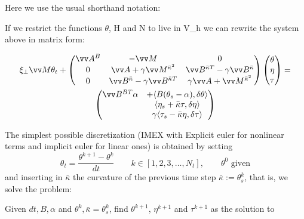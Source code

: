 Here we use the usual shorthand notation:


If we restrict the functions $\theta$, H and N to live in V_h we can rewrite the system above in matrix form:


\begin{multline}
\label{eq:4}
\xi_\perp\vv M \theta_t + 
\begin{pmatrix}
\vv A^B &  -\vv M & 0 \\
0 & 
 \vv A
+ \gamma \vv M^{\bar \kappa^2} &
 \vv B^{\bar\kappa T}
- \gamma\vv B^{\bar\kappa} \\
0 & 
 \vv B^{\bar\kappa}
- \gamma\vv B^{\bar\kappa T} 
&
%
%
\gamma \vv A
+ \vv M^{\bar \kappa^2}
\end{pmatrix}
%
\begin{pmatrix}
\theta\phantom{\big|\!\!}\\
\eta\phantom{\big|\!\!} \\
\tau\phantom{\big|\!\!}
\end{pmatrix}
=\\
\begin{pmatrix}
\vv B^{BT}\alpha & +\langle B(\theta_s-\alpha), \delta \theta\rangle\\
& \langle \eta_s+\bar\kappa\tau,\delta\eta\rangle
\\
&\gamma\langle\tau_{s}-\bar \kappa\eta, \delta\tau\rangle 
\end{pmatrix}
\end{multline}

The simplest possible discretization (IMEX with Explicit euler for
nonlinear terms and implicit euler for linear ones) is obtained by
setting
$$
\theta_t = \frac{\theta^{k+1} - \theta^k}{dt} \qquad k \in
[1,2,3,\ldots, N_t], \qquad \theta^0 \text{ given}
$$
and inserting in $\bar \kappa$ the curvature of the previous time step
$\bar \kappa := \theta^k_s$, that is, we solve the problem:

Given $dt, B, \alpha$ and $\theta^k, \bar \kappa = \theta^k_s$, find
$\theta^{k+1}$, $\eta^{k+1}$ and $\tau^{k+1}$ as the solution to

